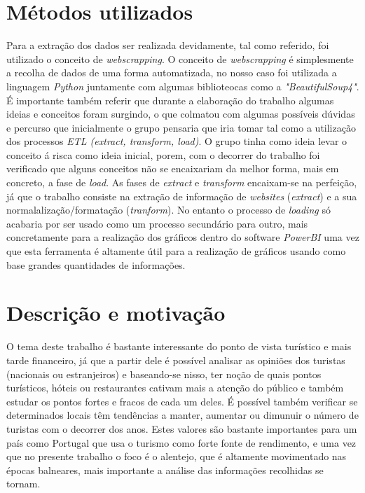 \section{Métodos utilizados}
Para a extração dos dados ser realizada devidamente, tal como referido, foi utilizado o conceito de \textit{webscrapping}. O conceito de \textit{webscrapping} é simplesmente a recolha de dados de uma forma automatizada, no nosso caso foi utilizada a linguagem \textit{Python} juntamente com algumas biblioteocas como a \textit{"BeautifulSoup4"}. É importante também referir que durante a elaboração do trabalho algumas ideias e conceitos foram surgindo, o que colmatou com algumas possíveis dúvidas e percurso que inicialmente o grupo pensaria que iria tomar tal como a utilização dos processos \textit{ETL (extract, transform, load)}. O grupo tinha como ideia levar o conceito á risca como ideia inicial, porem, com o decorrer do trabalho foi verificado que alguns conceitos não se encaixariam da melhor forma, mais em concreto, a fase de \textit{load}. As fases de \textit{extract} e \textit{transform} encaixam-se na perfeição, já que o trabalho consiste na extração de informação de \textit{websites} (\textit{extract}) e a sua normalalização/formatação (\textit{tranform}). No entanto o processo de \textit{loading} só acabaria por ser usado como um processo secundário para outro, mais concretamente para a realização dos gráficos dentro do software \textit{PowerBI} uma vez que esta ferramenta é altamente útil para a realização de gráficos usando como base grandes quantidades de informações.

\section{Descrição e motivação}
O tema deste trabalho é bastante interessante do ponto de vista turístico e mais tarde financeiro, já que a partir dele é possível analisar as opiniões dos turistas (nacionais ou estranjeiros) e baseando-se nisso, ter noção de quais pontos turísticos, hóteis ou restaurantes cativam mais a atenção do público e também estudar os pontos fortes e fracos de cada um deles. É possível também verificar se determinados locais têm tendências a manter, aumentar ou dimunuir o número de turistas com o decorrer dos anos. Estes valores são bastante importantes para um país como Portugal que usa o turismo como forte fonte de rendimento, e uma vez que no presente trabalho o foco é o alentejo, que é altamente movimentado nas épocas balneares, mais importante a análise das informações recolhidas se tornam. 

